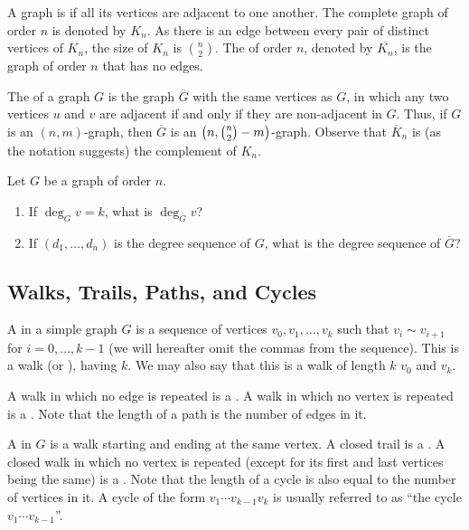 A graph is  if all its vertices are adjacent to one another. The complete graph of order $n$ is denoted by $K_n$. As there is an edge between every pair of distinct vertices of $K_n$, the size of $K_n$ is $\binom n 2$. The  of order $n$, denoted by $\overline{K_n}$, is the graph of order $n$ that has no edges.

The  of a graph $G$ is the graph $\overline G$ with the same vertices as $G$, in which any two vertices $u$ and $v$ are adjacent if and only if they are non-adjacent in $G$. Thus, if $G$ is an $(n, m)$-graph, then $\overline G$ is an $\pqty{n, \binom n 2 - m}$-graph. Observe that $\overline K_n$ is (as the notation suggests) the complement of $K_n$.

\begin{Exercise}
Let $G$ be a graph of order $n$.
\begin{enumerate}
\item If $\deg_G v = k$, what is $\deg_{\overline G} v$?
\item If $(d_1, \ldots, d_n)$ is the degree sequence of $G$, what is the degree sequence of $\overline G$?
\end{enumerate}
\end{Exercise}

\subsection{Walks, Trails, Paths, and Cycles}

A  in a simple graph $G$ is a sequence of vertices $v_0, v_1, \ldots, v_k$ such that $v_i \sim v_{i + 1}$ for $i = 0, \ldots, k - 1$ (we will hereafter omit the commas from the sequence). This is a walk  (or ), having  $k$. We may also say that this is a walk of length $k$  $v_0$ and  $v_k$.

A walk in which no edge is repeated is a . A walk in which no vertex is repeated is a . Note that the length of a path is the number of edges in it.

A  in $G$ is a walk starting and ending at the same vertex. A closed trail is a . A closed walk in which no vertex is repeated (except for its first and last vertices being the same) is a . Note that the length of a cycle is also equal to the number of vertices in it. A cycle of the form $v_1 \cdots v_{k-1} v_k$ is usually referred to as ``the cycle $v_1 \cdots v_{k-1}$''.

